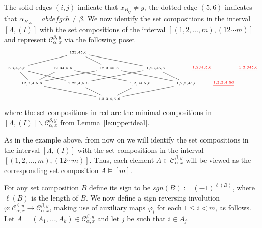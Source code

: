\documentclass[ALCO,ThmDefs,Unicode,epreuves]{cedram}
\newcommand{\red}[1]{\textcolor{red}{#1}}
\begin{document}
\begin{exam}
The solid edges $(i,j)$ indicate that $ x_{B_{ij}}\ne y$, the dotted edge $(5,6)$ indicates that $ \alpha_{B_{56}}=abdefgch\ne \beta$. 
We now identify the set compositions in the interval $[\Lambda,(I)]$ with the set compositions of the interval $[(1,2,\ldots,m),(12\cdots m)]$ 
and represent $\mathcal{C}_{\alpha,x}^{\beta,y}$ via the following poset
$$
\begin{tikzpicture}[scale=1.57,baseline=.5cm]
	\node (0) at (0,0) {$\scriptscriptstyle 1,2,3,4,5,6$};
	\node (12) at (-2.5,.5) {$\scriptscriptstyle 12,3,4,5,6$};
	\node (23) at (-1,.5) {$\scriptscriptstyle 1,23,4,5,6$};
	\node (34) at (1,.5) {$\scriptscriptstyle 1,2,34,5,6$};
	\node (45) at (2.5,.5) {$\scriptscriptstyle 1,2,3,45,6$};
	\node (56) at (3.7,.5) {$\scriptscriptstyle \red{\underline{1,2,3,4,56}}$};
	\draw (0) -- (12);
	\draw (0) -- (23);
	\draw (0) -- (34);
	\draw (0) -- (45);
	\node (123) at (-3,1) {$\scriptscriptstyle 123,4,5,6$};
	\node (12_34) at (-1.5,1) {$\scriptscriptstyle 12,34,5,6$};
	\node (12_45) at (0,1) {$\scriptscriptstyle 12,3,45,6$};
	\node (234) at (3,1) {$\scriptscriptstyle \red{\underline{1,234,5,6}}$};
	\node (23_45) at (1.5,1) {$\scriptscriptstyle 1,23,45,6$};
	\node (345) at (4.5,1) {$\scriptscriptstyle \red{\underline{1,2,345,6}}$};
	\draw (12)--(123);
	\draw (12)--(12_34);
	\draw (12)--(12_45);
	\draw (23)--(123);
	\draw (23)--(23_45);
	\draw (34)--(12_34);
	\draw (45)--(23_45);
	\draw (45)--(12_45);
	\node (123_45) at (-1,1.5) {$\scriptscriptstyle 123,45,6$};
	\draw (23_45)-- (123_45);
	\draw (123)--(123_45);
	\draw (12_45)--(123_45);
\end{tikzpicture} 
$$
where the set compositions in red are the minimal compositions in $[\Lambda,(I)] \backslash \mathcal{C}_{\alpha,x}^{\beta,y}$ from Lemma~\ref{le:upperideal}.
\end{exam}

\begin{rema}
As in the example above, from now on we will identify the set compositions in the interval $[\Lambda,(I)]$ with the set compositions in the interval $[(1,2,\ldots,m),(12\cdots m)]$.
Thus, each element $A\in \mathcal{C}_{\alpha,x}^{\beta,y}$ will be viewed as the corresponding set composition $A\models[m]$.
\end{rema}

For any set composition $B$ define its sign to be $sgn(B):=(-1)^{\ell (B)}$, where $\ell(B)$ is the length of $B$. We now define a sign reversing involution $\varphi\colon \mathcal{C}_{\alpha,x}^{\beta,y} \to \mathcal{C}_{\alpha,x}^{\beta,y}$, making use of auxiliary maps $\varphi _i$ for each $1\le i <m$, as follows.
Let $A=(A_1,\ldots,A_k)\in \mathcal{C}_{\alpha,x}^{\beta,y}$ and let $j$ be such that $i\in A_j$.
\end{document}
